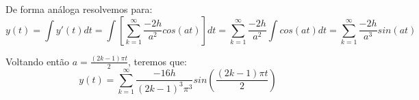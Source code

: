 De forma análoga resolvemos para:
\begin{equation*}
    y(t) = \int y'(t) dt = \int \left[\sum_{k=1}^\infty \frac{-2h}{a^2}cos(at)\right] dt = \sum_{k=1}^\infty \frac{-2h}{a^2} \int cos(at) dt = \sum_{k=1}^\infty \frac{-2h}{a^3}sin(at)
\end{equation*}

Voltando então $a = \frac{(2k-1)\pi t}{2}$, teremos que:
\begin{equation*}
    \boxed{y(t) = \sum_{k=1}^\infty \frac{-16h}{(2k-1)^3\pi^3}sin\left(\frac{(2k-1)\pi t }{2}\right)}
\end{equation*}